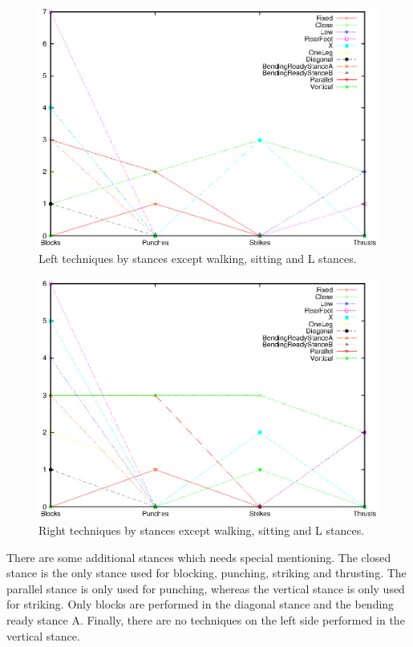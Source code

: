 \documentclass[10pt,twocolumn,a4paper]{article}
\begin{document}
  \begin{figure}
    \includegraphics[scale=0.65]{data/gnuplot/eps/stances_left_not_wsl}
    \caption{Left techniques by stances except walking, sitting and L stances.}
    \label{fig:stances_left_not_wsl}
  \end{figure}

  \begin{figure}
    \includegraphics[scale=0.65]{data/gnuplot/eps/stances_right_not_wsl}
    \caption{Right techniques by stances except walking, sitting and L
    stances.}
    \label{fig:stances_right_not_wsl}
  \end{figure}

  There are some additional stances which needs special mentioning. The closed
  stance is the only stance used for blocking, punching, striking and
  thrusting. The parallel stance is only used for punching, whereas the
  vertical stance is only used for striking. Only blocks are performed in the
  diagonal stance and the bending ready stance A. Finally, there are no
  techniques on the left side performed in the vertical stance.
\end{document}
